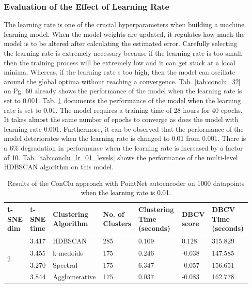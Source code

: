 \subsubsection{Evaluation of the Effect of Learning Rate}
The learning rate is one of the crucial hyperparameters when building a machine learning model. When the model weights are updated, it regulates how much the model is to be altered after calculating the estimated error. Carefully selecting the learning rate is extremely necessary because if the learning rate is too small, then the training process will be extremely low and it can get stuck at a local minima. Whereas, if the learning rate s too high, then the model can oscillate around the global optima without reaching a convergence. Tab. \ref{tab:conclu_32} on Pg. 60 already shows the performance of the model when the learning rate is set to 0.001. Tab. \ref{tab:conclu_lr_01} documents the performance of the model when the learning rate is set to 0.01. The model requires a training time of 28 hours for 40 epochs. It takes almost the same number of epochs to converge as does the model with learning rate 0.001. Furthermore, it can be observed that the performance of the model deteriorates when the learning rate is changed to 0.01 from 0.001. There is a 6\% degradation in performance when the learning rate is increased by a factor of 10. Tab. \ref{tab:conclu_lr_01_levels} shows the performance of the multi-level \ac{HDBSCAN} algorithm on this model.
\begin{table}[H]
  \setlength\extrarowheight{10pt}
  \caption{Results of the ConClu approach with PointNet autoencoder on 1000 datapoints when the learning rate is 0.01. }
  \centering
  \begin{tabular}{|p{30pt}|p{50pt}|p{60pt}|p{50pt}|p{50pt}|p{50pt}|p{40pt}|}
    \toprule
    \ac{t-SNE} dim	& \ac{t-SNE} time & Clustering Algorithm & No. of Clusters & Clustering Time (seconds) & \ac{DBCV} score & \ac{DBCV} Time (seconds)\\
    \midrule
    \multirow{4}{30pt}{2}	& 3.417	& \ac{HDBSCAN}	& 285	& 0.109	& 0.128	& 315.829 \\ \cline{2-7} 
    & 3.455	& k-medoids	& 175	& 0.246	& -0.038	& 147.585 \\ \cline{2-7} 
    & 3.270	& Spectral	& 175	& 6.347	& -0.057	& 156.651 \\ \cline{2-7}
    & 3.844	& Agglomerative	& 175	& 0.037	& -0.083	& 162.778 \\ 
    \bottomrule
  \end{tabular}
  \label{tab:conclu_lr_01}
\end{table} 

